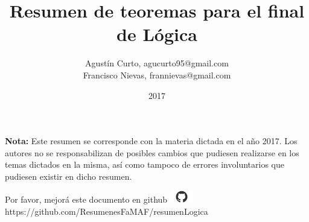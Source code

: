 \documentclass[12pt,a4paper]{article}
\author{Agustín Curto, agucurto95@gmail.com \\
			 Francisco Nievas, frannievas@gmail.com}
\title{Resumen de teoremas para el final \\ de Lógica}
\date{2017}
\newcommand{\PN}{\par\noindent}
\begin{document}
	\clearpage\maketitle
	\thispagestyle{empty}
	\tableofcontents

	\vspace{5cm}
	\PN \textbf{Nota:} Este resumen se corresponde con la materia dictada en el año 2017. Los autores no se
	responsabilizan de posibles cambios que pudiesen realizarse en los temas dictados en la misma, así como tampoco de
	errores involuntarios que pudiesen existir en dicho resumen.

	\vspace{\fill}
	\begin{center}
		Por favor, mejorá este documento en github
		\includegraphics[width=1cm]{graphics/github.png} \\
		https://github.com/ResumenesFaMAF/resumenLogica
	\end{center}

	
\end{document}
